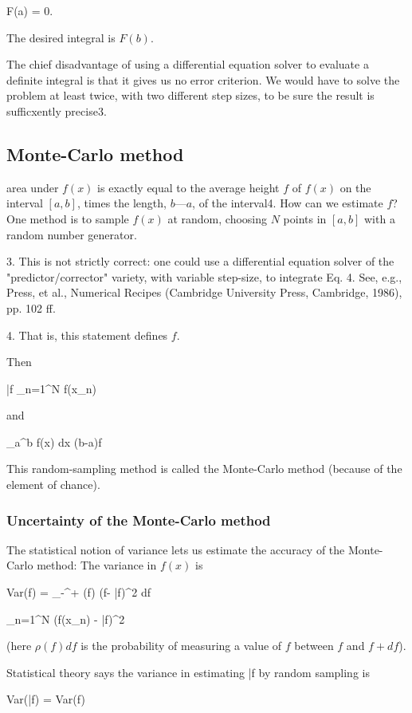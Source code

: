 F(a) = 0.

The desired integral is $F(b)$.

The chief disadvantage of using a differential equation solver to evaluate a deﬁnite integral is that it gives us no error criterion. We would have to solve the problem at least twice, with two different step sizes, to be sure the result is sufficxently precise3.

\subsection{Monte-Carlo method}
 area under $f(x)$ is exactly equal to the average height $f$ of $f(x)$ on the interval $[a, b]$, times the length, $b—a$, of the interval4. How can we estimate $f$? One method is to sample $f(x)$ at random, choosing $N$ points in $[a,b]$ with a random number generator.

3. This is not strictly correct: one could use a differential equation solver of the "predictor/corrector" variety, with variable step-size, to integrate Eq. 4. See, e.g., Press, et al., Numerical Recipes (Cambridge University Press, Cambridge, 1986), pp. 102 ff.

4. That is, this statement defines $f$.

Then

\bar{f} \approx {} \sum_{n=1}^{N} f(x_n)

and

\int_{a}^{b} f(x) dx \approx (b-a)f

This random-sampling method is called the Monte-Carlo method (because of the element of chance).

\subsubsection{Uncertainty of the Monte-Carlo method}
The statistical notion of variance lets us estimate the accuracy of the Monte-Carlo method: The variance in $f(x)$ is

Var(f) = \int_{-\inf}^{+\inf} \rho(f) (f- \bar{f})^2 df

\approx {} \sum_{n=1}^{N} (f(x_n) - \bar{f})^2

(here $\rho(f)df$ is the probability of measuring a value of $f$ between $f$ and $f + df$).

Statistical theory says the variance in estimating \bar{f} by random sampling is

Var(\bar{f}) =  Var(f)

